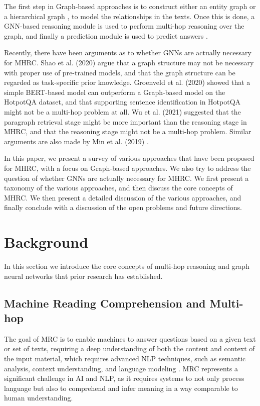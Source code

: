 \documentclass[sigplan,screen,nonacm]{acmart}
\begin{document}

The first step in Graph-based approaches is to construct either an entity graph \cite{RN81, RN117, RN122, RN141, RN91, RN130} or a hierarchical 
graph \cite{RN124, RN119, RN130}, to model the relationships in the texts. Once this is done, a 
GNN-based reasoning module is used to perform multi-hop reasoning over the graph, and finally a prediction module is used to predict answers 
\cite{RN23}.

Recently, there have been arguments as to whether GNNs are actually necessary for MHRC. Shao et al. (2020) \cite{RN127} argue that 
a graph structure may not be necessary with proper use of pre-trained models, and that the graph structure can be regarded as task-specific 
prior knowledge. Groenveld et al. (2020) \cite{RN126} showed that a simple BERT-based model can outperform a Graph-based model on the HotpotQA 
dataset, and that supporting sentence identification in HotpotQA might not be a multi-hop problem at all. Wu et al. (2021) \cite{RN106} 
suggested that the paragraph retrieval stage might be more important than the reasoning stage in MHRC, and that the reasoning stage might not 
be a multi-hop problem. Similar arguments are also made by Min et al. (2019) \cite{RN150}.

In this paper, we present a survey of various approaches that have been proposed for MHRC, with a focus on Graph-based approaches. We also 
try to address the question of whether GNNs are actually necessary for MHRC. We first present a taxonomy of the various approaches, and then 
discuss the core concepts of MHRC. We then present a detailed discussion of the various approaches, and finally conclude with a discussion of 
the open problems and future directions.

\section{Background}
In this section we introduce the core concepts of multi-hop reasoning and graph neural networks that prior research has established.  

\subsection{Machine Reading Comprehension and Multi-hop}
The goal of MRC is to enable machines to answer questions based on a given text or set of texts, requiring a deep understanding of both the 
content and context of the input material, which requires advanced NLP techniques, such as semantic analysis, context understanding, and 
language modeling \cite{RN208}. MRC represents a significant challenge in AI and NLP, as it requires systems to not only process language 
but also to comprehend and infer meaning in a way comparable to human understanding.
\end{document}
